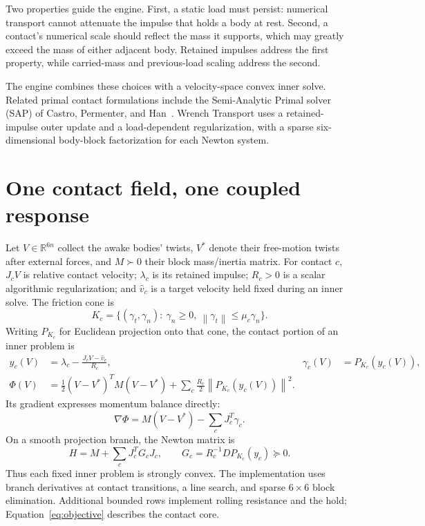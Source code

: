 \documentclass[10pt,letterpaper]{article}
\newcommand{\R}{\mathbb{R}}
\newcommand{\norm}[1]{\left\lVert#1\right\rVert}
\begin{document}
Two properties guide the engine. First, a static load must persist: numerical transport cannot attenuate the impulse that holds a body at rest. Second, a contact's numerical scale should reflect the mass it supports, which may greatly exceed the mass of either adjacent body. Retained impulses address the first property, while carried-mass and previous-load scaling address the second.

The engine combines these choices with a velocity-space convex inner solve. Related primal contact formulations include the Semi-Analytic Primal solver (SAP) of Castro, Permenter, and Han~\cite{sap}. Wrench Transport uses a retained-impulse outer update and a load-dependent regularization, with a sparse six-dimensional body-block factorization for each Newton system.

\newpage
\section{One contact field, one coupled response}
Let $V\in\R^{6n}$ collect the awake bodies' twists, $V^*$ denote their free-motion twists after external forces, and $M\succ0$ their block mass/inertia matrix. For contact $c$, $J_cV$ is relative contact velocity; $\lambda_c$ is its retained impulse; $R_c>0$ is a scalar algorithmic regularization; and $\widehat v_c$ is a target velocity held fixed during an inner solve. The friction cone is
\begin{equation}
 K_c=\{(\gamma_t,\gamma_n):\ \gamma_n\geq0,\ \norm{\gamma_t}\leq\mu_c\gamma_n\}.
\end{equation}
Writing $P_{K_c}$ for Euclidean projection onto that cone, the contact portion of an inner problem is
\begin{align}
 y_c(V)&=\lambda_c-\frac{J_cV-\widehat v_c}{R_c}, &
 \gamma_c(V)&=P_{K_c}(y_c(V)),\\
 \Phi(V)&=\tfrac12(V-V^*)^TM(V-V^*)
       +\sum_c \tfrac{R_c}{2}\norm{P_{K_c}(y_c(V))}^2.\label{eq:objective}
\end{align}
Its gradient expresses momentum balance directly:
\begin{equation}
 \nabla\Phi=M(V-V^*)-\sum_c J_c^T\gamma_c.
\end{equation}
On a smooth projection branch, the Newton matrix is
\begin{equation}
 H=M+\sum_c J_c^T G_cJ_c,\qquad
 G_c=R_c^{-1}DP_{K_c}(y_c)\succeq0.
\end{equation}
Thus each fixed inner problem is strongly convex. The implementation uses branch derivatives at contact transitions, a line search, and sparse $6\times6$ block elimination. Additional bounded rows implement rolling resistance and the hold; Equation~\eqref{eq:objective} describes the contact core.
\end{document}
